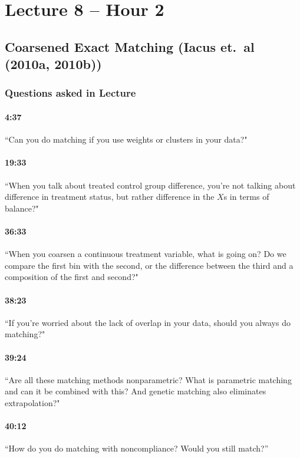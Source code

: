 \documentclass[11pt]{article}
\begin{document}
\section{Lecture 8 -- Hour 2}

\subsection{Coarsened Exact Matching (Iacus et.\ al (2010a, 2010b))}

\subsubsection{Questions asked in Lecture}


\paragraph{4:37} ``Can you do matching if you use weights or clusters in your data?"

\paragraph{19:33} ``When you talk about treated control group difference, you're not talking about difference in treatment status, but rather difference in the $X$s in terms of balance?"

\paragraph{36:33} ``When you coarsen a continuous treatment variable, what is going on?  Do we compare the first bin with the second, or the difference between the third and a composition of the first and second?"

\paragraph{38:23} ``If you're worried about the lack of overlap in your data, should you always do matching?"

\paragraph{39:24} ``Are all these matching methods nonparametric?  What is parametric matching and can it be combined with this?  And genetic matching also eliminates extrapolation?"

\paragraph{40:12} ``How do you do matching with noncompliance?  Would you still match?''
\end{document}
